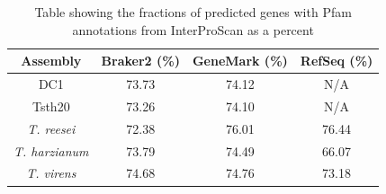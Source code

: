 \begin{table}[h!]
  \centering
  \begin{tabular}{|c|c|c|c|}
    \hline
    Assembly & Braker2 (\%) & GeneMark (\%) & RefSeq (\%) \\ \hline
    DC1 & 73.73 & 74.12 & N/A \\ \hline
    Tsth20 & 73.26 & 74.10 & N/A \\ \hline
    \textit{T. reesei} & 72.38 & 76.01 & 76.44 \\ \hline
    \textit{T. harzianum} & 73.79 & 74.49 & 66.07 \\ \hline
    \textit{T. virens} & 74.68 & 74.76 & 73.18 \\ \hline
  \end{tabular}
  \caption[InterProScan Pfam Evidence]{Table showing the fractions of predicted
    genes with Pfam annotations from InterProScan as a percent}\label{table:ips-pfam}
\end{table}



